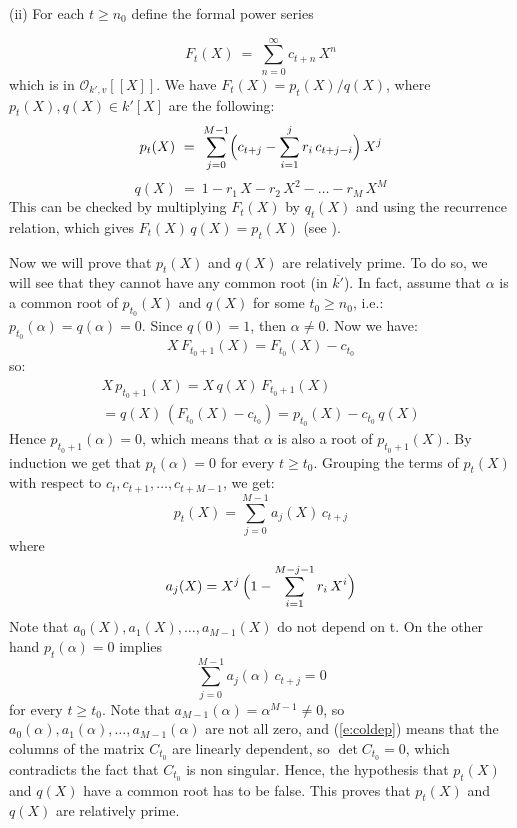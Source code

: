 \documentclass[12pt]{report} %
\theoremstyle{definition}
\theoremstyle{remark}
\begin{document}
\item{(ii)} For each $t \geq n_0$ define the formal 
power series 

\begin{equation}
F_t(X)\ =\ \sum_{n=0}^{\infty} c_{t+n}\,X^n
\end{equation}
which is in $\mathcal O_{k',v}[[X]]$. 
We have $F_t(X) = p_t(X)/q(X)$, 
where $p_t(X),q(X) \in k'[X]$ are the following:
\begin{equation}
p_t(X)\ =\ \sum_{j=0}^{M-1} \Bigl( c_{t+j} - 
                    \sum_{i=1}^{j} r_i\,c_{t+j-i} \Bigr)\,X^j
\end{equation}
\begin{equation}
q(X)\ =\ 1 - r_1\,X - r_2\,X^2 - \dots - r_M\,X^M
\end{equation}
This can be checked by multiplying $F_t(X)$ by $q_t(X)$ 
and using the recurrence relation, which gives 
$F_t(X)\,q(X) = p_t(X)$ (see \cite{poorten:sp}). 

Now we will prove that $p_t(X)$ and $q(X)$ are relatively 
prime. To do so, we will see that they cannot have any 
common root (in $\overline {k'}$). In fact, assume 
that $\alpha$ is a common root of $p_{t_0}(X)$ and $q(X)$ 
for some $t_0 \geq n_0$, i.e.: 
$p_{t_0}(\alpha) = q(\alpha) = 0$. 
Since $q(0)=1$, then $\alpha \neq 0$. Now we have:
\begin{equation}
X\,F_{t_0+1}(X) = F_{t_0}(X) - c_{t_0}
\end{equation}
so:
\begin{multline}
X\,p_{t_0+1}(X) = X\,q(X)\,F_{t_0+1}(X) \\
= q(X)\,(F_{t_0}(X) - c_{t_0}) = p_{t_0}(X) - c_{t_0}\,q(X)
\end{multline}
Hence $p_{t_0+1}(\alpha) = 0$, which means that $\alpha$ is 
also a root of $p_{t_0+1}(X)$. By induction we get that 
$p_t(\alpha) = 0$ for every $t \geq t_0$. Grouping the 
terms of $p_t(X)$ with respect to $c_t,c_{t+1},\dots,c_{t+M-1}$, 
we get:
\begin{equation}
p_t(X) = \sum_{j=0}^{M-1} a_j(X)\,c_{t+j}
\end{equation}
where 
\begin{equation}
a_j(X) = X^j\,\Bigl( 1 - \sum_{i=1}^{M-j-1} r_i\,X^i \Bigr)
\end{equation}
Note that $a_0(X),a_1(X),\dots,a_{M-1}(X)$ do not depend on t. 
On the other hand $p_t(\alpha)=0$ implies
\begin{equation}
\label{e:coldep}
\sum_{j=0}^{M-1} a_j(\alpha)\,c_{t+j} = 0
\end{equation}
for every $t \geq t_0$. Note that $a_{M-1}(\alpha)=\alpha^{M-1}
\neq 0$, so $a_0(\alpha),a_1(\alpha),\dots,a_{M-1}(\alpha)$ 
are not all zero, and (\ref{e:coldep}) means that the columns 
of the matrix $C_{t_0}$ are linearly dependent, so 
$\det C_{t_0}=0$, which contradicts the fact that $C_{t_0}$ 
is non singular. Hence, the hypothesis that $p_t(X)$ and 
$q(X)$ have a common root has to be false. This proves that 
$p_t(X)$ and $q(X)$ are relatively prime. 
\end{document}
